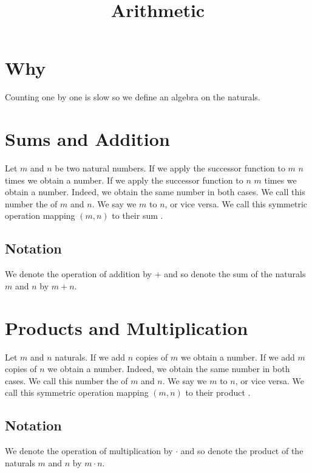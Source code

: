 






\title{Arithmetic}

\section{Why}

Counting one by one is slow so we define an algebra on the naturals.

\section{Sums and Addition}

Let $m$ and $n$ be two natural numbers.
If we apply the successor function to $m$ $n$ times we obtain a number.
If we apply the successor function to $n$ $m$ times we obtain a number.
Indeed, we obtain the same number in both cases.
We call this number the  of $m$ and $n$.
We say we  $m$ to $n$, or vice versa.
We call this symmetric operation mapping $(m, n)$ to their sum .

\subsection{Notation}

We denote the operation of addition by $+$ and so denote the sum of the naturals $m$ and $n$ by $m + n$.

\section{Products and Multiplication}

Let $m$ and $n$ naturals.
If we add $n$ copies of $m$ we obtain a number.
If we add $m$ copies of $n$ we obtain a number.
Indeed, we obtain the same number in both cases.
We call this number the  of $m$ and $n$.
We say we  $m$ to $n$, or vice versa.
We call this symmetric operation mapping $(m, n)$ to their product .

\subsection{Notation}

We denote the operation of multiplication by $\cdot$ and so denote the product of the naturals $m$ and $n$ by $m \cdot n$.


